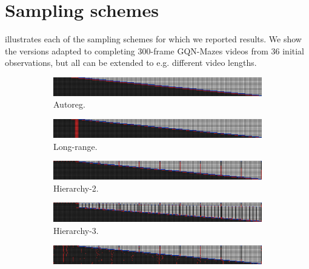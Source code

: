 \section{Sampling schemes}
 illustrates each of the sampling schemes for which we reported results. We show the versions adapted to completing 300-frame GQN-Mazes videos from 36 initial observations, but all can be extended to e.g. different video lengths.
\begin{figure}[h]
    \centering
    \begin{subfigure}[t]{\textwidth}
        \includegraphics[width=\textwidth]{figs/fdm/inference-modes/sample_vis_autoreg_T=300_sampling_10_out_of_20_red_blue_flipped.png}
        \caption{Autoreg.}
    \end{subfigure}
    \begin{subfigure}[t]{\textwidth}
        \includegraphics[width=\textwidth]{figs/fdm/inference-modes/sample_vis_mixed-autoreg-independent_T=300_sampling_10_out_of_20_red_blue_flipped.png}
        \caption{Long-range.}
    \end{subfigure}
    \begin{subfigure}[t]{\textwidth}
        \includegraphics[width=\textwidth]{figs/fdm/inference-modes/sample_vis_hierarchy-2_T=300_sampling_10_out_of_20_red_blue_flipped.png}
        \caption{Hierarchy-2.}
    \end{subfigure}
    \begin{subfigure}[t]{\textwidth}
        \includegraphics[width=\textwidth]{figs/fdm/inference-modes/sample_vis_hierarchy-3_T=300_sampling_10_out_of_20_red_blue_flipped.png}
        \caption{Hierarchy-3.}
    \end{subfigure}
    \begin{subfigure}[t]{\textwidth}
        \includegraphics[width=\textwidth]{figs/fdm/inference-modes/sample_vis_adaptive-hierarchy-2_T=300_sampling_10_out_of_20_index-0_red_blue_flipped.png}

\end{subfigure}
\end{figure}

